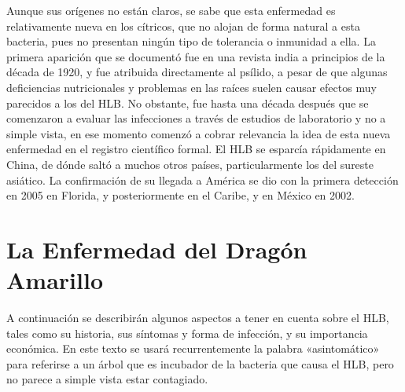 Aunque sus orígenes no están claros, se sabe que esta enfermedad es relativamente nueva en los cítricos, que no alojan de forma natural a esta bacteria, pues no presentan ningún tipo de tolerancia o inmunidad a ella. La primera aparición que se documentó fue en una revista india a principios de la década de 1920, y fue atribuida directamente al psílido, a pesar de que algunas deficiencias nutricionales y problemas en las raíces suelen causar efectos muy parecidos a los del HLB. No obstante, fue hasta una década después que se comenzaron a evaluar las infecciones a través de estudios de laboratorio y no a simple vista, en ese momento comenzó a cobrar relevancia la idea de esta nueva enfermedad en el registro científico formal. El HLB se esparcía rápidamente en China, de dónde saltó a muchos otros países, particularmente los del sureste asiático. La confirmación de su llegada a América se dio con la primera detección en 2005 en Florida, y posteriormente en el Caribe, y en México en 2002.\cite{gottwald2007citrus}\\

\section{La Enfermedad del Dragón Amarillo}
A continuación se describirán algunos aspectos a tener en cuenta sobre el HLB, tales como su historia, sus síntomas y forma de infección, y su importancia económica. En este texto se usará recurrentemente la palabra «asintomático» para referirse a un árbol que es incubador de la bacteria que causa el HLB, pero no parece a simple vista estar contagiado.

